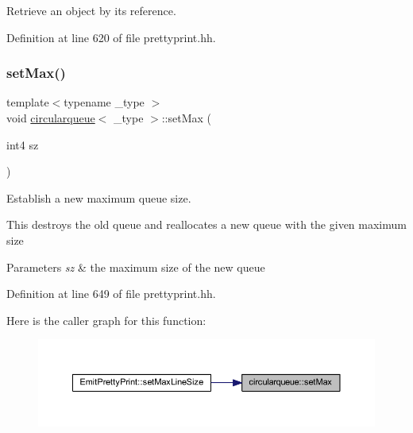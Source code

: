 Retrieve an object by its reference. 



Definition at line 620 of file prettyprint.\+hh.

\mbox{\label{classcircularqueue_ae6a9f2564ea93c5beec9212764bf25de}} 
\subsubsection{\texorpdfstring{setMax()}{setMax()}}
{\footnotesize\ttfamily template$<$typename \+\_\+type $>$ \\
void \mbox{\hyperlink{classcircularqueue}{circularqueue}}$<$ \+\_\+type $>$\+::set\+Max (\begin{DoxyParamCaption}\item[{int4}]{sz }\end{DoxyParamCaption})}



Establish a new maximum queue size. 

This destroys the old queue and reallocates a new queue with the given maximum size 
\begin{DoxyParams}{Parameters}
{\em sz} & the maximum size of the new queue \\
\hline
\end{DoxyParams}


Definition at line 649 of file prettyprint.\+hh.

Here is the caller graph for this function\+:
\nopagebreak
\begin{figure}[H]
\begin{center}
\leavevmode
\includegraphics[width=350pt]{classcircularqueue_ae6a9f2564ea93c5beec9212764bf25de_icgraph}
\end{center}
\end{figure}
\mbox{\label{classcircularqueue_a665042a45ccb86bcb465d8b7f1efa9c5}} 
